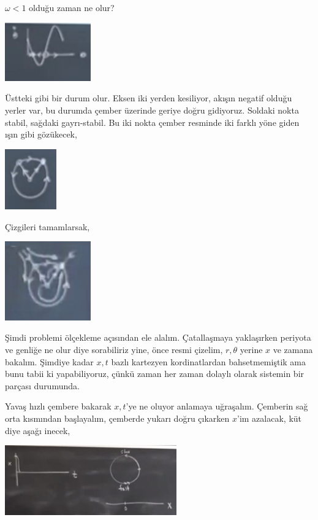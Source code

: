 \documentclass[12pt,fleqn]{article}\usepackage{../../common}
\begin{document}
$\omega < 1$ olduğu zaman ne olur? 

\includegraphics[width=10em]{14_15.png}

Üstteki gibi bir durum olur. Eksen iki yerden kesiliyor, akışın negatif
olduğu yerler var, bu durumda çember üzerinde geriye doğru
gidiyoruz. Soldaki nokta stabil, sağdaki gayrı-stabil. Bu iki nokta çember
resminde iki farklı yöne giden ışın gibi gözükecek, 

\includegraphics[width=6em]{14_16.png}

Çizgileri tamamlarsak,

\includegraphics[width=10em]{14_17.png}

Şimdi problemi ölçekleme açısından ele alalım. Çatallaşmaya yaklaşırken
periyota ve genliğe ne olur diye sorabiliriz yine, önce resmi çizelim,
$r,\theta$ yerine $x$ ve zamana bakalım. Şimdiye kadar $x,t$ bazlı
kartezyen kordinatlardan bahsetmemiştik ama bunu tabii ki yapabiliyoruz,
çünkü zaman her zaman dolaylı olarak sistemin bir parçası durumunda.

Yavaş hızlı çembere bakarak $x,t$'ye ne oluyor anlamaya uğraşalım. Çemberin
sağ orta kısmından başlayalım, çemberde yukarı doğru çıkarken $x$'im
azalacak, küt diye aşağı inecek, 

\includegraphics[width=20em]{14_18.png}
\end{document}
